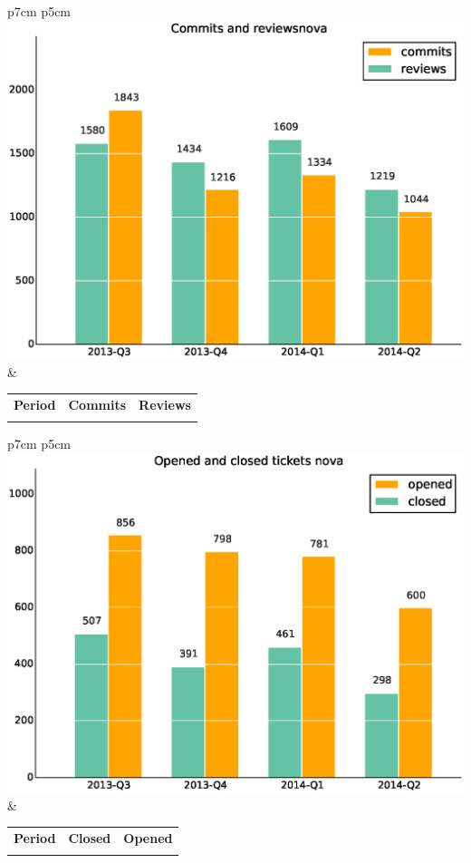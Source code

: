 \documentclass[a4wide,11pt]{report}
\begin{document}
\begin{tabular}{p{7cm} p{5cm}}
    \vspace{0pt} 
    \includegraphics[scale=.35]{figs/commitsnova.eps}
    & 
    \vspace{0pt}
    \begin{tabular}{l|r|r|}%
    \bfseries Period & \bfseries Commits & \bfseries Reviews %
    \csvreader[head to column names]{data/commitsnova.csv}{}%
    {\\ & \commits & \submitted}
    \end{tabular}
\end{tabular}

\begin{tabular}{p{7cm} p{5cm}}
    \vspace{0pt} 
    \includegraphics[scale=.35]{figs/closednova.eps}
    & 
    \vspace{0pt}
    \begin{tabular}{l|r|r|}%
\bfseries Period & \bfseries Closed & \bfseries Opened
    \csvreader[head to column names]{data/closednova.csv}{}%
    {\\ & \closed & \opened}
    \end{tabular}
\end{tabular}
\end{document}
